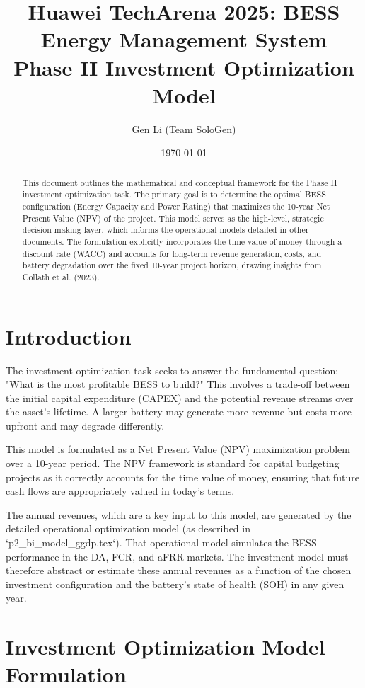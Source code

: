 \documentclass[11pt, a4paper]{article}
\title{Huawei TechArena 2025: BESS Energy Management System \\ \large Phase II Investment Optimization Model}
\author{Gen Li (Team SoloGen)}
\date{\today}
\begin{document}
\maketitle
\thispagestyle{fancy}

\begin{abstract}
This document outlines the mathematical and conceptual framework for the Phase II investment optimization task. The primary goal is to determine the optimal BESS configuration (Energy Capacity and Power Rating) that maximizes the 10-year Net Present Value (NPV) of the project. This model serves as the high-level, strategic decision-making layer, which informs the operational models detailed in other documents. The formulation explicitly incorporates the time value of money through a discount rate (WACC) and accounts for long-term revenue generation, costs, and battery degradation over the fixed 10-year project horizon, drawing insights from Collath et al. (2023).
\end{abstract}

\section{Introduction}
The investment optimization task seeks to answer the fundamental question: "What is the most profitable BESS to build?" This involves a trade-off between the initial capital expenditure (CAPEX) and the potential revenue streams over the asset's lifetime. A larger battery may generate more revenue but costs more upfront and may degrade differently.

This model is formulated as a Net Present Value (NPV) maximization problem over a 10-year period. The NPV framework is standard for capital budgeting projects as it correctly accounts for the time value of money, ensuring that future cash flows are appropriately valued in today's terms.

The annual revenues, which are a key input to this model, are generated by the detailed operational optimization model (as described in `p2_bi_model_ggdp.tex`). That operational model simulates the BESS performance in the DA, FCR, and aFRR markets. The investment model must therefore abstract or estimate these annual revenues as a function of the chosen investment configuration and the battery's state of health (SOH) in any given year.

\section{Investment Optimization Model Formulation}
\end{document}
